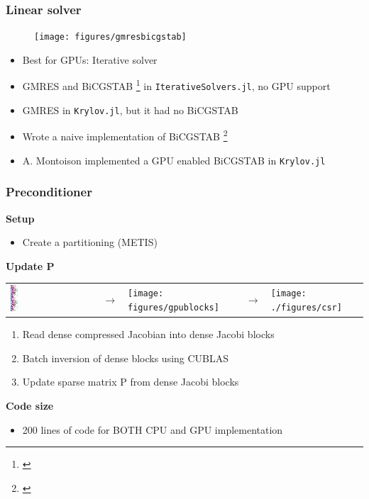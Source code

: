 \begin{frame}
  \frametitle{Linear solver}
    \begin{figure}
      \texttt{[image: figures/gmresbicgstab]}
    \end{figure}
  \begin{itemize}
    \item Best for GPUs: Iterative solver
    \item GMRES and BiCGSTAB \footnote{\cite{sleijpen1993bicgstab}} in \lstinline{IterativeSolvers.jl}, no GPU support 
    \item GMRES in \lstinline{Krylov.jl}, but it had no BiCGSTAB 
    \item Wrote a naive implementation of BiCGSTAB \footnote{\cite{bicgstabVorst}}
    \item A. Montoison implemented a GPU enabled BiCGSTAB in \lstinline{Krylov.jl}
  \end{itemize}
\end{frame}

\begin{frame}
  \frametitle{Preconditioner}
  {\bf Setup}
  \begin{itemize}
    \item Create a partitioning (METIS)
  \end{itemize}
  {\bf Update P}
  \begin{tabular}{m{}m{}m{}m{}m{}}
        \includegraphics[width=0.09\textwidth]{./figures/compressed_coloring.PNG}
    &
    {\Huge $\rightarrow$}
    &
        \texttt{[image: figures/gpublocks]}
    &
    {\Huge $\rightarrow$}
    &
        \texttt{[image: ./figures/csr]}
    \\
  \end{tabular}
    \begin{enumerate}
      \item Read dense compressed Jacobian into dense Jacobi blocks
      \item Batch inversion of dense blocks using CUBLAS
      \item Update sparse matrix P from dense Jacobi blocks
    \end{enumerate}
  {\bf Code size}
  \begin{itemize}
    \item 200 lines of code for BOTH CPU and GPU implementation
  \end{itemize}
\end{frame}

